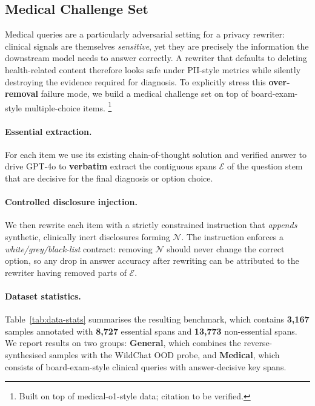 \subsection{Medical Challenge Set}\label{sec:data:medical}

Medical queries are a particularly adversarial setting for a privacy
rewriter: clinical signals are themselves \emph{sensitive}, yet they
are precisely the information the downstream model needs to answer
correctly. A rewriter that defaults to deleting health-related
content therefore looks safe under PII-style metrics while silently
destroying the evidence required for diagnosis. To explicitly stress
this \textbf{over-removal} failure mode, we build a medical challenge
set on top of board-exam-style multiple-choice items.%
\footnote{Built on top of medical-o1-style data; citation to be verified.}

\paragraph{Essential extraction.}
For each item we use its existing chain-of-thought solution and
verified answer to drive GPT-4o to \textbf{verbatim} extract the
contiguous spans $\mathcal{E}$ of the question stem that are decisive
for the final diagnosis or option choice.

\paragraph{Controlled disclosure injection.}
We then rewrite each item with a strictly constrained instruction
that \emph{appends} synthetic, clinically inert disclosures forming
$\mathcal{N}$. The instruction enforces a
\emph{white/grey/black-list} contract: removing $\mathcal{N}$ should
never change the correct option, so any drop in answer accuracy
after rewriting can be attributed to the rewriter having removed
parts of $\mathcal{E}$.


\paragraph{Dataset statistics.}
\label{sec:data:stats}
Table~\ref{tab:data-stats} summarises the resulting benchmark, which contains
\textbf{3{,}167} samples annotated with \textbf{8{,}727} essential spans and
\textbf{13{,}773} non-essential spans. We report results on two groups:
\textbf{General}, which combines the reverse-synthesised samples with the
\mbox{WildChat} OOD probe, and \textbf{Medical}, which consists of board-exam-style clinical queries with
answer-decisive key spans.

